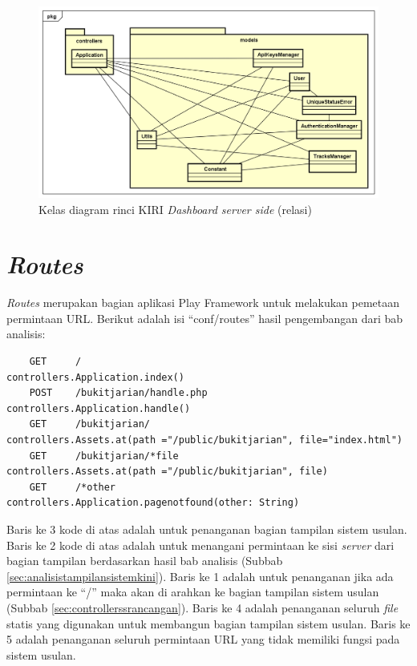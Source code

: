 \begin{figure}[htbp]
	\centering
		\includegraphics[scale=0.55]{Gambar/4_classdiagram_relasi.png}
	\caption{Kelas diagram rinci KIRI \textit{Dashboard server side} (relasi)}
	\label{fig:4_classdiagramrelasi}
\end{figure}

\section{\textit{Routes}}
\label{sec:perancanganroutes}
\textit{Routes} merupakan bagian aplikasi Play Framework untuk melakukan pemetaan permintaan URL. Berikut adalah isi ``conf/routes'' hasil pengembangan dari bab analisis:
\begin{lstlisting}
	GET		/	 		 					 controllers.Application.index()
	POST	/bukitjarian/handle.php	 		 controllers.Application.handle()
	GET     /bukitjarian/		             controllers.Assets.at(path ="/public/bukitjarian", file="index.html")
	GET     /bukitjarian/*file         		 controllers.Assets.at(path ="/public/bukitjarian", file)
	GET     /*other	         		 	     controllers.Application.pagenotfound(other: String)
\end{lstlisting}

Baris ke 3 kode di atas adalah untuk penanganan bagian tampilan sistem usulan. Baris ke 2 kode di atas adalah untuk menangani permintaan ke sisi \textit{server} dari bagian tampilan berdasarkan hasil bab analisis (Subbab \ref{sec:analisistampilansistemkini}). Baris ke 1 adalah untuk penanganan jika ada permintaan ke ``/'' maka akan di arahkan ke bagian tampilan sistem usulan (Subbab \ref{sec:controllerssrancangan}). Baris ke 4 adalah penanganan seluruh \textit{file} statis yang digunakan untuk membangun bagian tampilan sistem usulan. Baris ke 5 adalah penanganan seluruh permintaan URL yang tidak memiliki fungsi pada sistem usulan.

